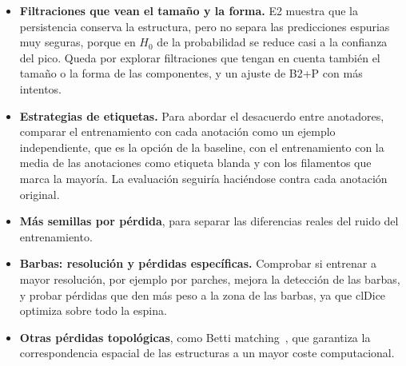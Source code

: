 \begin{itemize}
  \item \textbf{Filtraciones que vean el tamaño y la forma.} E2
  muestra que la persistencia conserva la estructura, pero no separa las
  predicciones espurias muy seguras, porque en $H_0$ de la probabilidad
  se reduce casi a la confianza del pico. Queda por explorar filtraciones
  que tengan en cuenta también el tamaño o la forma de las componentes,
  y un ajuste de B2+P con más intentos.
  \item \textbf{Estrategias de etiquetas.} Para abordar el desacuerdo
  entre anotadores, comparar el entrenamiento con cada anotación como un
  ejemplo independiente, que es la opción de la baseline, con el
  entrenamiento con la media de las anotaciones como etiqueta blanda y
  con los filamentos que marca la mayoría. La evaluación seguiría
  haciéndose contra cada anotación original.
  \item \textbf{Más semillas por pérdida}, para separar las diferencias
  reales del ruido del entrenamiento.
  \item \textbf{Barbas: resolución y pérdidas específicas.} Comprobar si
  entrenar a mayor resolución, por ejemplo por parches, mejora la
  detección de las barbas, y probar pérdidas que den más peso a la zona
  de las barbas, ya que clDice optimiza sobre todo la espina.
  \item \textbf{Otras pérdidas topológicas}, como Betti
  matching~\cite{stucki2023}, que garantiza la correspondencia espacial
  de las estructuras a un mayor coste computacional.
\end{itemize}
